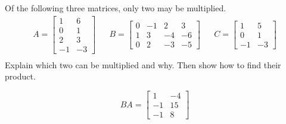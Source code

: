 
\begin{exerciseStatement}


Of the following three matrices, only two may be multiplied. 
\begin{align*} A= \left[\begin{array}{cc}
1 & 6 \\
0 & 1 \\
2 & 3 \\
-1 & -3
\end{array}\right]  & & B= \left[\begin{array}{cccc}
0 & -1 & 2 & 3 \\
1 & 3 & -4 & -6 \\
0 & 2 & -3 & -5
\end{array}\right]  & & C= \left[\begin{array}{cc}
1 & 5 \\
0 & 1 \\
-1 & -3
\end{array}\right]  \\ \end{align*}
             Explain which two can be multiplied and why. Then show how to find their product.


\end{exerciseStatement}
    
\begin{exerciseAnswer} 
\[BA= \left[\begin{array}{cc}
1 & -4 \\
-1 & 15 \\
-1 & 8
\end{array}\right] \]
\end{exerciseAnswer}
    
